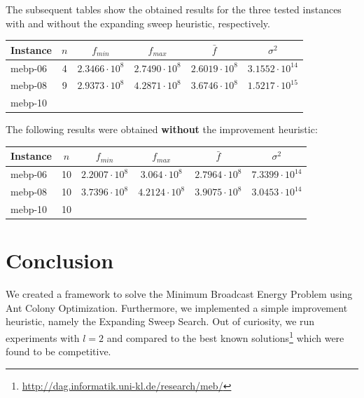 \documentclass{article}
\theoremstyle{definition}
\begin{document}
The subsequent tables show the obtained results for the three tested instances with and without the expanding sweep heuristic, respectively.

\begin{center}
\begin{tabular}{|l|c|c|c|c|c|}
	\hline
	\textbf{Instance} & \footnotesize $n$ & \footnotesize $f_{min}$ & \footnotesize $f_{max}$ & \footnotesize $\bar f$ & \footnotesize $\sigma^{2}$ \\
	\hline
	mebp-06 & 4 & $2.3466\cdot10^{8}$ & $2.7490\cdot10^{8}$ & $2.6019\cdot10^{8}$ & $3.1552\cdot10^{14}$ \\
	\hline
	mebp-08 & 9 & $2.9373\cdot10^{8}$ & $4.2871\cdot10^{8}$ & $3.6746\cdot10^{8}$ & $1.5217\cdot10^{15}$ \\
	\hline
	mebp-10 \\
	\hline
\end{tabular}
\end{center}

The following results were obtained \textbf{without} the improvement heuristic:

\begin{center}
\begin{tabular}{|l|c|c|c|c|c|}
	\hline
	\textbf{Instance} & \footnotesize $n$ & \footnotesize $f_{min}$ & \footnotesize $f_{max}$ & \footnotesize $\bar f$ & \footnotesize $\sigma^{2}$ \\
	\hline
	mebp-06 & 10 & $2.2007\cdot10^{8}$ & $3.064\cdot10^{8}$ & $2.7964\cdot10^{8}$ & $7.3399\cdot10^{14}$ \\
	\hline
	mebp-08 & 10 & $3.7396\cdot10^{8}$ & $4.2124\cdot10^{8}$ & $3.9075\cdot10^{8}$ & $3.0453\cdot10^{14}$ \\
	\hline
	mebp-10 & 10 & \\
	\hline
\end{tabular}
\end{center}

\section{Conclusion}

We created a framework to solve the Minimum Broadcast Energy Problem using Ant Colony Optimization. Furthermore, we implemented a simple improvement heuristic, namely the Expanding Sweep Search. Out of curiosity, we run experiments with $l=2$ and compared to the best known solutions\footnote{\url{http://dag.informatik.uni-kl.de/research/meb/}} which were found to be competitive.



\end{document}
